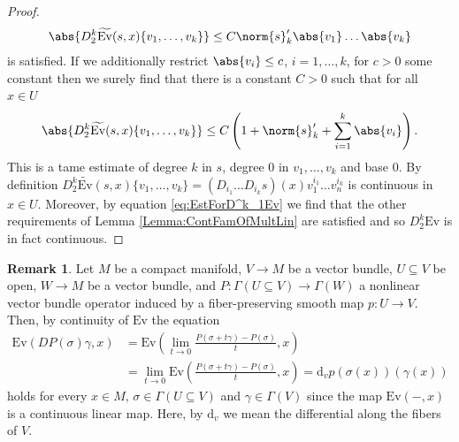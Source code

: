 \documentclass[12pt,a4paper]{article}
\theoremstyle{plain}
\theoremstyle{definition}
\newtheorem{remark}[theorem]{Remark}
\newcommand{\nnorm}[2]{\norm{#1}_{#2}}
\newcommand{\Ev}{\mathrm{Ev}}
\renewcommand{\d}{\mathrm{d}}
\begin{document}
\begin{proof}
\begin{align}
\label{eq:EstForD^k_1Ev}
    \abs{D_2^k\widetilde{\Ev}(s,x)\{v_1,\ldots,v_k\}}\leq  C\nnorm{s}{k}'\abs{v_1}\ldots\abs{v_k}
\end{align}
is satisfied.
If we additionally restrict $\abs{v_i}\leq c$, $i=1,\ldots,k$, for $c>0$ some constant then we surely find that there is a constant $C>0$ such that for all $x\in U$
\begin{align*}
    \abs{D_2^k\widetilde{\Ev}(s,x)\{v_1,\ldots,v_k\}}\leq C\left(1+\nnorm{s}{k}'+\sum_{i=1}^k\abs{v_i}\right).
\end{align*}
This is a tame estimate of degree $k$ in $s$, degree $0$ in $v_1,\ldots,v_k$ and base $0$. 
By definition $D_2^k\widetilde{\Ev}(s,x)\{v_1,\ldots,v_k\}=(D_{i_1}\ldots D_{i_k} s)(x)v_1^{i_1}\ldots v_n^{i_k}$ is continuous in $x\in U$. Moreover, by equation \eqref{eq:EstForD^k_1Ev} we find that the other requirements of Lemma \ref{Lemma:ContFamOfMultLin} are satisfied and so $D^k_2\Ev$ is in fact continuous.  
\end{proof}

\begin{remark}
\label{Rem:DifferentialEvAtPoint}
Let $M$ be a compact manifold, $V\to M$ be a vector bundle, $U\subseteq V$ be open, $W\to M$ be a vector bundle, and $P:\Gamma(U\subseteq V)\to \Gamma(W)$ a nonlinear vector bundle operator induced by a fiber-preserving smooth map $p:U\to V$. Then, by continuity of $\Ev$ the equation
\begin{align*}
    \Ev(DP(\sigma)\gamma,x)&=\Ev\left(\lim_{t\to 0}\frac{P(\sigma+t\gamma)-P(\sigma)}{t},x\right)\\
    &=\lim_{t\to 0}\Ev\left(\frac{P(\sigma+t\gamma)-P(\sigma)}{t},x\right)=\d_vp(\sigma(x))(\gamma(x))
\end{align*}
holds for every $x\in M$, $\sigma\in \Gamma(U\subseteq V)$ and $\gamma\in \Gamma(V)$ since the map $\Ev(-,x)$ is a continuous linear map. Here, by $\d_v$ we mean the differential along the fibers of $V$.
\end{remark}
\end{document}

